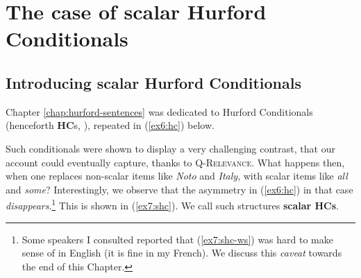 \iffalse
\section{The case of scalar Hurford Conditionals}\label{sec7:shc}

\subsection{Introducing scalar Hurford Conditionals}

Chapter \ref{chap:hurford-sentences} was dedicated to Hurford Conditionals (henceforth \textbf{HC}s, \citep{Mandelkern2018}), repeated in (\ref{ex6:hc}) below.

\begin{exe}
	\begin{xlist}
	\end{xlist}
\end{exe}

Such conditionals were shown to display a very challenging contrast, that our account could eventually capture, thanks to \textsc{Q-Relevance}. What happens then, when one replaces non-scalar items like \textit{Noto} and \textit{Italy}, with scalar items like \textit{all} and \textit{some}? 
Interestingly, we observe that the asymmetry in (\ref{ex6:hc}) in that case \textit{disappears}.\footnote{Some speakers I consulted reported that (\ref{ex7:shc-ws}) was hard to make sense of in English (it is fine in my French). We discuss this \textit{caveat} towards the end of this Chapter.} This is shown in (\ref{ex7:shc}). We call such structures \textbf{scalar HCs}.



\begin{exe}
	\ex\label{ex7:shc}
	\begin{xlist}
		\label{ex7:shc-sw}
		\label{ex7:shc-ws}
	\end{xlist}
\end{exe}


